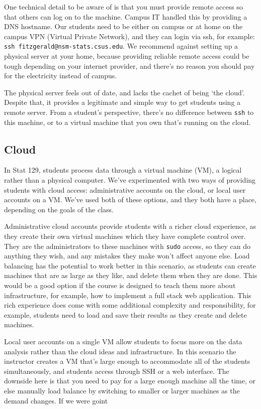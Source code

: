 \documentclass[12pt]{article}
\begin{document}
One technical detail to be aware of is that you must provide remote access so that others can log on to the machine.
Campus IT handled this by providing a DNS hostname.
Our students need to be either on campus or at home on the campus VPN (Virtual Private Network), and they can login via ssh, for example: \texttt{ssh fitzgerald@nsm-stats.csus.edu}.
We recommend against setting up a physical server at your home, because providing reliable remote access could be tough depending on your internet provider, and there's no reason you should pay for the electricity instead of campus.

The physical server feels out of date, and lacks the cachet of being `the cloud'.
Despite that, it provides a legitimate and simple way to get students using a remote server.
From a student's perspective, there's no difference between \texttt{ssh} to this machine, or to a virtual machine that you own that's running on the cloud.

\subsection{Cloud}

In Stat 129, students process data through a virtual machine (VM), a logical rather than a physical computer.
We've experimented with two ways of providing students with cloud access: administrative accounts on the cloud, or local user accounts on a VM.
We've used both of these options, and they both have a place, depending on the goals of the class.

Administrative cloud accounts provide students with a richer cloud experience, as they create their own virtual machines which they have complete control over.
They are the administrators to these machines with \texttt{sudo} access, so they can do anything they wish, and any mistakes they make won't affect anyone else.
Load balancing has the potential to work better in this scenario, as students can create machines that are as large as they like, and delete them when they are done.
This would be a good option if the course is designed to teach them more about infrastructure, for example, how to implement a full stack web application.
This rich experience does come with some additional complexity and responsibility, for example, students need to load and save their results as they create and delete machines.

Local user accounts on a single VM allow students to focus more on the data analysis rather than the cloud ideas and infrastructure.
In this scenario the instructor creates a VM that's large enough to accommodate all of the students simultaneously, and students access through SSH or a web interface.
The downside here is that you need to pay for a large enough machine all the time, or else manually load balance by switching to smaller or larger machines as the demand changes.
If we were goint
\end{document}
